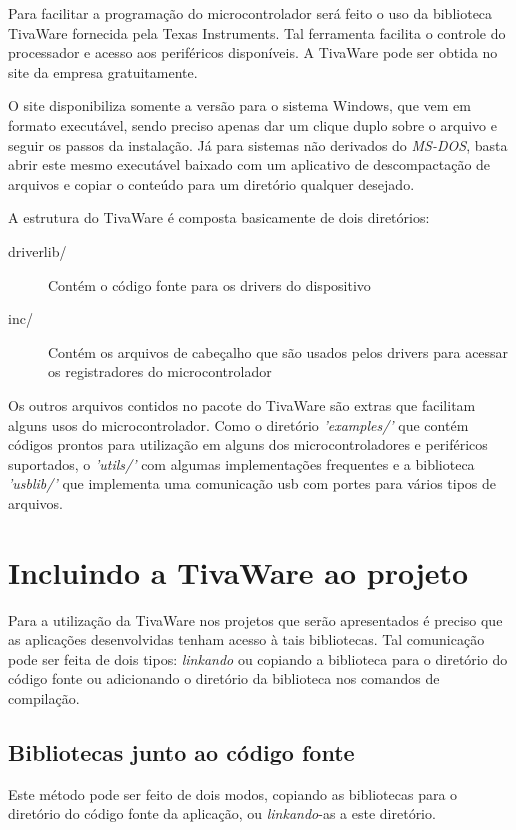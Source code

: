 Para facilitar a programação do microcontrolador será feito o uso da biblioteca TivaWare fornecida pela Texas Instruments. Tal ferramenta facilita o controle do processador e acesso aos periféricos disponíveis. A TivaWare pode ser obtida no site da empresa gratuitamente.

O site disponibiliza somente a versão para o sistema Windows, que vem em formato executável, sendo preciso apenas dar um clique duplo sobre o arquivo e seguir os passos da instalação. Já para sistemas não derivados do \emph{MS-DOS}, basta abrir este mesmo executável baixado com um aplicativo de descompactação de arquivos e copiar o conteúdo para um diretório qualquer desejado.

A estrutura do TivaWare é composta basicamente de dois diretórios:

\begin{description}
	\item [driverlib/] Contém o código fonte para os drivers do dispositivo
	\item [inc/] Contém os arquivos de cabeçalho que são usados pelos drivers para acessar os registradores do microcontrolador
\end{description}

Os outros arquivos contidos no pacote do TivaWare são extras que facilitam alguns usos do microcontrolador. Como o diretório \emph{'examples/'} que contém códigos prontos para utilização em alguns dos microcontroladores e periféricos suportados, o \emph{'utils/'} com algumas implementações frequentes e a biblioteca \emph{'usblib/'} que implementa uma comunicação usb com portes para vários tipos de arquivos.


\section{Incluindo a TivaWare  ao projeto}

Para a utilização da TivaWare nos projetos que serão apresentados é preciso que as aplicações desenvolvidas tenham acesso à tais bibliotecas. Tal comunicação pode ser feita de dois tipos: \emph{linkando} ou copiando a biblioteca para o diretório do código fonte ou adicionando o diretório da biblioteca nos comandos de compilação.

\subsection{Bibliotecas junto ao código fonte}

Este método pode ser feito de dois modos, copiando as bibliotecas para o diretório do código fonte da aplicação, ou \emph{linkando}-as a este diretório.

